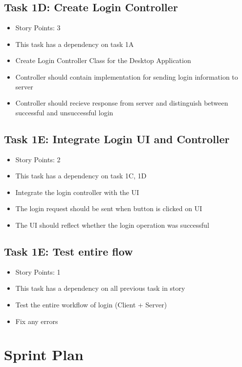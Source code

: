 \documentclass[12pt]{article}
\begin{document}
\subsection{Task 1D: Create Login Controller}
\begin{itemize}%
\item Story Points: 3
\item This task has a dependency on task 1A
\item Create Login Controller Class for the Desktop Application
\item Controller should contain implementation for sending login information to server
\item Controller should recieve response from server and distinguish between successful and unsuccessful login  
\end{itemize}

\subsection{Task 1E: Integrate Login UI and Controller}
\begin{itemize}%
\item Story Points: 2
\item This task has a dependency on task 1C, 1D
\item Integrate the login controller with the UI
\item The login request should be sent when button is clicked on UI
\item The UI should reflect whether the login operation was successful
\end{itemize}

\subsection{Task 1E: Test entire flow}
\begin{itemize}%
\item Story Points: 1
\item This task has a dependency on all previous task in story 
\item Test the entire workflow of login (Client + Server)
\item Fix any errors 
\end{itemize}

\newpage
\section{Sprint Plan}
\end{document}
